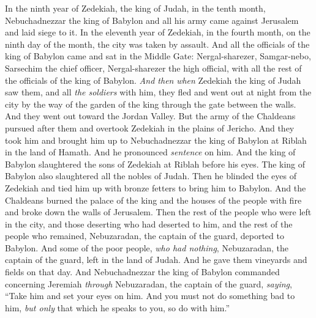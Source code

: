\begin{biblechapter} %
 In the ninth year of Zedekiah, the king of Judah, in the tenth month, Nebuchadnezzar the king of Babylon and all his army came against Jerusalem and laid siege to it.
\verse In the eleventh year of Zedekiah, in the fourth month, on the ninth day of the month, the city was taken by assault.
\verse And all the officials of the king of Babylon came and sat in the Middle Gate: Nergal-sharezer, Samgar-nebo, Sarsechim the chief officer, Nergal-sharezer the high official, with all the rest of the officials of the king of Babylon.
\verse \textit{And then} \textit{when} Zedekiah the king of Judah saw them, and all \textit{the soldiers} with him, they fled and went out at night from the city by the way of the garden of the king through the gate between the walls. And they went out toward the Jordan Valley.
\verse But the army of the Chaldeans pursued after them and overtook Zedekiah in the plains of Jericho. And they took him and brought him up to Nebuchadnezzar the king of Babylon at Riblah in the land of Hamath. And he pronounced \textit{sentence} on him.
\verse And the king of Babylon slaughtered the sons of Zedekiah at Riblah before his eyes. The king of Babylon also slaughtered all the nobles of Judah.
\verse Then he blinded the eyes of Zedekiah and tied him up with bronze fetters to bring him to Babylon.
\verse And the Chaldeans burned the palace of the king and the houses of the people with fire and broke down the walls of Jerusalem.
\verse Then the rest of the people who were left in the city, and those deserting who had deserted to him, and the rest of the people who remained, Nebuzaradan, the captain of the guard, deported to Babylon.
\verse And some of the poor people, \textit{who had nothing}, Nebuzaradan, the captain of the guard, left in the land of Judah. And he gave them vineyards and fields on that day.
\verse And Nebuchadnezzar the king of Babylon commanded concerning Jeremiah \textit{through} Nebuzaradan, the captain of the guard, \textit{saying},
\verse “Take him and set your eyes on him. And you must not do something bad to him, \textit{but only} that which he speaks to you, so do with him.”

\end{biblechapter}
